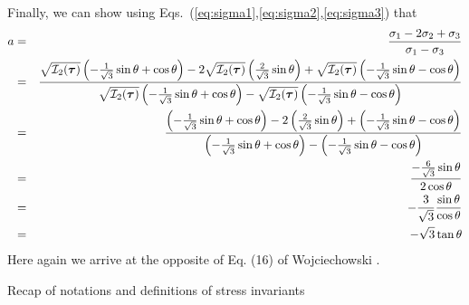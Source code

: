 Finally, we can show using Eqs.~(\ref{eq:sigma1},\ref{eq:sigma2},\ref{eq:sigma3}) that
\begin{eqnarray}
a 
&=&\frac{\sigma_1-2\sigma_2+\sigma_3}{\sigma_1-\sigma_3} \nonumber\\
&=& 
\frac{
\sqrt{{\cal I}_2({\bm \tau})} \left(-\frac{1}{\sqrt{3}}\sin \theta +\cos\theta \right) 
-2
\sqrt{{\cal I}_2({\bm \tau})} \left(\frac{2}{\sqrt{3}}\sin \theta   \right)   
+
\sqrt{{\cal I}_2({\bm \tau})} \left(-\frac{1}{\sqrt{3}}\sin \theta- \cos \theta \right)  
}{
\sqrt{{\cal I}_2({\bm \tau})} \left(-\frac{1}{\sqrt{3}}\sin \theta +\cos\theta \right)
- 
\sqrt{{\cal I}_2({\bm \tau})} \left(-\frac{1}{\sqrt{3}}\sin \theta- \cos \theta \right)  
}
\nonumber \\
&=& 
\frac{
\left(-\frac{1}{\sqrt{3}}\sin \theta +\cos\theta \right) 
-2
\left(\frac{2}{\sqrt{3}}\sin \theta   \right)   
+
\left(-\frac{1}{\sqrt{3}}\sin \theta- \cos \theta \right)  
}{
\left(-\frac{1}{\sqrt{3}}\sin \theta +\cos\theta \right)
- 
\left(-\frac{1}{\sqrt{3}}\sin \theta- \cos \theta \right)  
}
\nonumber \\
&=& 
\frac{
-\frac{6}{\sqrt{3}}\sin \theta  
}
{
2\cos\theta
}
\nonumber\\
&=& -\frac{3}{\sqrt{3}} \frac{\sin\theta}{\cos\theta} \nonumber\\
&=& -\sqrt{3} \tan\theta
\end{eqnarray}
Here again we arrive at the opposite of Eq. (16) of Wojciechowski \cite{wojc18}. 

\newpage

\begin{center}
{\Large Recap of notations and definitions of stress invariants}
\end{center}

